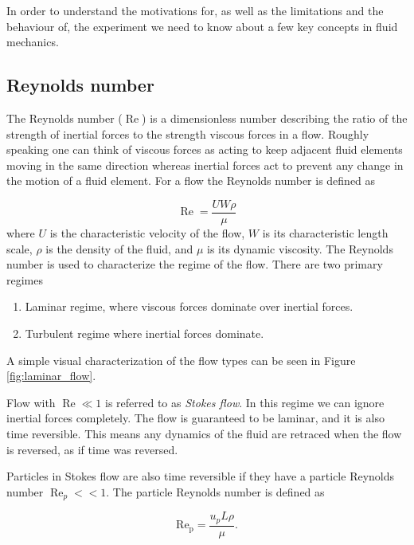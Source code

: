\label{sec:fluid}
In order to understand the motivations for, as well as the limitations and the behaviour of, the experiment we need to know about a few key concepts in fluid mechanics.

\subsection{Reynolds number}
The Reynolds number ($\operatorname{Re}$) is a dimensionless number describing the ratio of the strength of inertial forces to the strength viscous forces in a flow. Roughly speaking one can think of viscous forces as acting to keep adjacent fluid elements moving in the same direction whereas inertial forces act to prevent any change in the motion of a fluid element. For a flow the Reynolds number is defined as \cite{introfluid}

\begin{equation}\label{eq:reynolds}
\operatorname{Re} = \frac{U W \rho}{\mu}
\end{equation}
where $U$ is the characteristic velocity of the flow, $W$ is its characteristic length scale, $\rho$ is the density of the fluid, and $\mu$ is its dynamic viscosity. The Reynolds number is used to characterize the regime of the flow. There are two primary regimes
\begin{enumerate}
\item Laminar regime, where viscous forces dominate over inertial forces.
\item Turbulent regime where inertial forces dominate.
\end{enumerate}

\noindent A simple visual characterization of the flow types can be seen in Figure \ref{fig:laminar_flow}. 

Flow with $\operatorname{Re}\ll 1$ is referred to as \emph{Stokes flow}. In this regime we can ignore inertial forces completely. The flow is guaranteed to be laminar, and it is also time reversible. This means any dynamics of the fluid are retraced when the flow is reversed, as if time was reversed. ~\cite{introfluid3}
 
Particles in Stokes flow are also time reversible if they have a particle Reynolds number $\operatorname{Re}_p << 1$. The particle Reynolds number is defined as \cite{JonasLic}

\begin{equation}\label{eq:reynoldsparticle}
\operatorname{Re_p} = \frac{u_p L \rho}{\mu}.
\end{equation}


